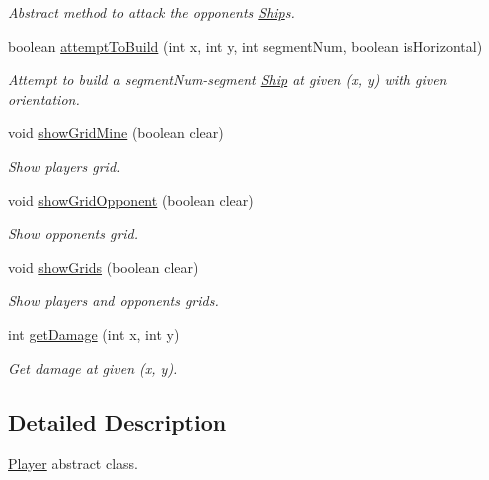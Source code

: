 \begin{DoxyCompactItemize}
\begin{DoxyCompactList}\small\item\em Abstract method to attack the opponent\textquotesingle{}s \hyperlink{classShip}{Ship}\textquotesingle{}s. \end{DoxyCompactList}\item 
boolean \hyperlink{classPlayer_a21c42ba135673c82075eebb3f9ea6d5c}{attempt\+To\+Build} (int x, int y, int segment\+Num, boolean is\+Horizontal)
\begin{DoxyCompactList}\small\item\em Attempt to build a segment\+Num-\/segment \hyperlink{classShip}{Ship} at given (x, y) with given orientation. \end{DoxyCompactList}\item 
void \hyperlink{classPlayer_ae551f266c116f22887d278f6beaf9e75}{show\+Grid\+Mine} (boolean clear)
\begin{DoxyCompactList}\small\item\em Show player\textquotesingle{}s grid. \end{DoxyCompactList}\item 
void \hyperlink{classPlayer_ade7e5623438ad21421091dcc201b367c}{show\+Grid\+Opponent} (boolean clear)
\begin{DoxyCompactList}\small\item\em Show opponent\textquotesingle{}s grid. \end{DoxyCompactList}\item 
void \hyperlink{classPlayer_ad571760f9739182566e3817e515fd3c1}{show\+Grids} (boolean clear)
\begin{DoxyCompactList}\small\item\em Show player\textquotesingle{}s and opponent\textquotesingle{}s grids. \end{DoxyCompactList}\item 
int \hyperlink{classPlayer_ac4e41793e0e2fd8cfaabad6775cdfaa0}{get\+Damage} (int x, int y)
\begin{DoxyCompactList}\small\item\em Get damage at given (x, y). \end{DoxyCompactList}\end{DoxyCompactItemize}


\subsection{Detailed Description}
\hyperlink{classPlayer}{Player} abstract class. 

